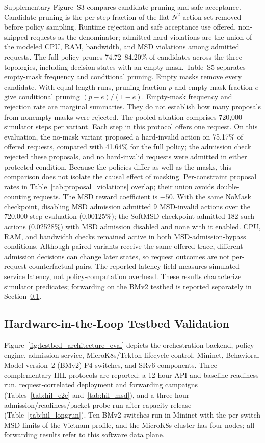 \documentclass[final,5p]{elsarticle}
\newcommand{\rev}[1]{\textcolor{revisiongreen}{#1}}
\let\newrev\rev
\begin{document}
\newrev{Supplementary Figure~S3 compares candidate pruning and safe acceptance. Candidate pruning is the per-step fraction of the flat $N^2$ action set removed before policy sampling. Runtime rejection and safe acceptance use offered, non-skipped requests as the denominator; admitted hard violations are the union of the modeled CPU, RAM, bandwidth, and MSD violations among admitted requests. The full policy prunes 74.72--84.20\% of candidates across the three topologies, including decision states with an empty mask. Table~S5 separates empty-mask frequency and conditional pruning. Empty masks remove every candidate. With equal-length runs, pruning fraction \(p\) and empty-mask fraction \(e\) give conditional pruning \((p-e)/(1-e)\). Empty-mask frequency and rejection rate are marginal summaries. They do not establish how many proposals from nonempty masks were rejected. The pooled ablation comprises 720,000 simulator steps per variant. Each step in this protocol offers one request. On this evaluation, the no-mask variant proposed a hard-invalid action on 75.17\% of offered requests, compared with 41.64\% for the full policy; the admission check rejected these proposals, and no hard-invalid requests were admitted in either protected condition. Because the policies differ as well as the masks, this comparison does not isolate the causal effect of masking. Per-constraint proposal rates in Table~\ref{tab:proposal_violations} overlap; their union avoids double-counting requests. The MSD reward coefficient is $-50$. With the same NoMask checkpoint, disabling MSD admission admitted 9 MSD-invalid actions over the 720,000-step evaluation (0.00125\%); the SoftMSD checkpoint admitted 182 such actions (0.02528\%) with MSD admission disabled and none with it enabled. CPU, RAM, and bandwidth checks remained active in both MSD-admission-bypass conditions. Although paired variants receive the same offered trace, different admission decisions can change later states, so request outcomes are not per-request counterfactual pairs. The reported latency field measures simulated service latency, not policy-computation overhead. These results characterize simulator predicates; forwarding on the BMv2 testbed is reported separately in Section~\ref{subsec:testbed_validation}.}



\subsection{\newrev{Hardware-in-the-Loop Testbed Validation}}
\label{subsec:testbed_validation}
\newrev{Figure~\ref{fig:testbed_architecture_eval} depicts the orchestration backend, policy engine, admission service, MicroK8s/Tekton lifecycle control, Mininet, Behavioral Model version~2 (BMv2) P4 switches, and SRv6 components. Three complementary HIL protocols are reported: a 12-hour API and baseline-readiness run, request-correlated deployment and forwarding campaigns (Tables~\ref{tab:hil_e2e} and~\ref{tab:hil_msd}), and a three-hour admission/readiness/packet-probe run after capacity release (Table~\ref{tab:hil_longrun}). Ten BMv2 switches run in Mininet with the per-switch MSD limits of the Vietnam profile, and the MicroK8s cluster has four nodes; all forwarding results refer to this software data plane.}
\end{document}

